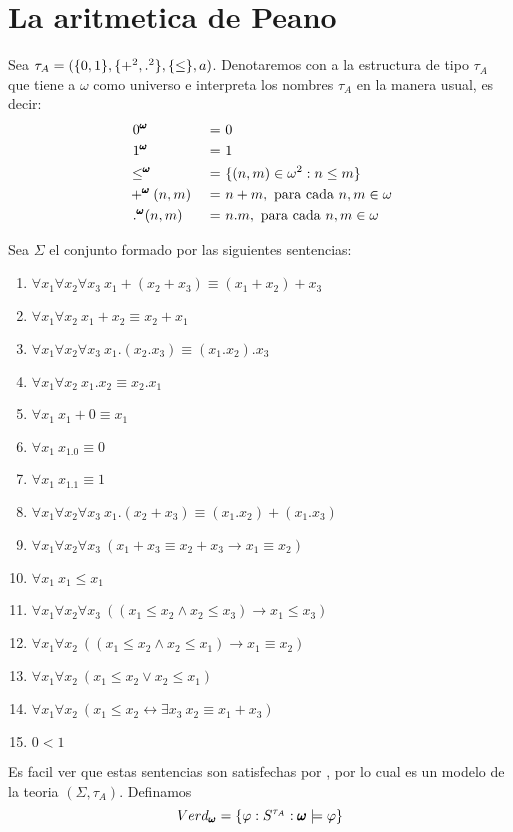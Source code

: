 
\section{La aritmetica de Peano}

\begin{definition}
  Sea $\tau_A = (\{0,1\},\{+^2,.^2\},\{\leq\},a)$. Denotaremos con \pomega a la estructura de tipo $\tau_A$
  que tiene a $\omega$ como universo e interpreta los nombres $\tau_A$ en la manera usual, es decir:
  \begin{alignat*}{4}
    &\ 0^{\pmb{\omega}} &\ =&\ 0\\
    &\ 1^{\pmb{\omega}} &\ =&\ 1\\
    &\leq^{\pmb{\omega}} &\ =&\ \{(n,m)\in \omega^2: n\leq m\}\\
    &+^{\pmb{\omega}}(n,m) &\ =&\ n+m, \text{ para cada } n,m\in\omega\\
    &\ .^{\pmb{\omega}}(n,m) &\ =&\ n.m, \text{ para cada } n,m\in\omega
  \end{alignat*}

  Sea $\Sigma$ el conjunto formado por las siguientes sentencias:\begin{enumerate}
    \item $\forall x_1 \forall x_2 \forall x_3\ x_1+(x_2+x_3)\equiv(x_1+x_2)+x_3$
    \item $\forall x_1 \forall x_2\ x_1+x_2\equiv x_2+x_1$
    \item $\forall x_1 \forall x_2 \forall x_3\ x_1.(x_2.x_3)\equiv(x_1.x_2).x_3$
    \item $\forall x_1 \forall x_2\ x_1.x_2\equiv x_2.x_1$ 
    \item $\forall x_1\ x_1+0\equiv x_1$
    \item $\forall x_1\ x_1.0\equiv 0$
    \item $\forall x_1\ x_1.1\equiv 1$
    \item $\forall x_1 \forall x_2 \forall x_3\ x_1.(x_2+x_3)\equiv(x_1.x_2)+(x_1.x_3)$
    \item $\forall x_1 \forall x_2 \forall x_3\ (x_1+x_3\equiv x_2+x_3\rightarrow x_1\equiv x_2)$
    \item $\forall x_1\ x_1\leq x_1$
    \item $\forall x_1 \forall x_2 \forall x_3\ ((x_1\leq x_2\land x_2\leq x_3)\rightarrow x_1\leq x_3)$
    \item $\forall x_1 \forall x_2\ ((x_1\leq x_2 \land x_2\leq x_1)\rightarrow x_1\equiv x_2)$
    \item $\forall x_1 \forall x_2\ (x_1\leq x_2 \lor x_2\leq x_1)$
    \item $\forall x_1 \forall x_2\ (x_1\leq x_2 \leftrightarrow \exists x_3\ x_2\equiv x_1+x_3)$
    \item $0<1$
  \end{enumerate}

  Es facil ver que estas sentencias son satisfechas por \pomega, por lo cual \pomega es un modelo de la teoria $(\Sigma, \tau_A)$. Definamos
  $$
  Verd_{\pmb{\omega}} = \{\varphi: S^{\tau_A}:\pmb{\omega}\models\varphi\}
  $$

  \end{definition}
